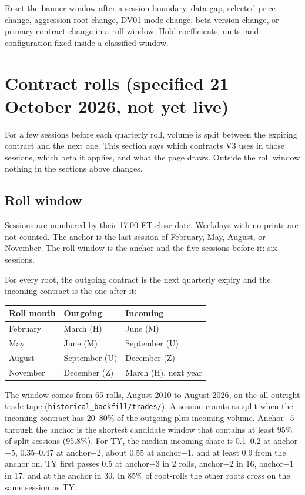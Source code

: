 \documentclass[11pt]{article}
\begin{document}
Reset the banner window after a session boundary, data gap, selected-price change, aggression-root change, DV01-mode change, beta-version change, or primary-contract change in a roll window. Hold coefficients, units, and configuration fixed inside a classified window.

\section{Contract rolls (specified 21 October 2026, not yet live)}

For a few sessions before each quarterly roll, volume is split between the expiring contract and the next one. This section says which contracts V3 uses in those sessions, which beta it applies, and what the page draws. Outside the roll window nothing in the sections above changes.

\subsection{Roll window}

Sessions are numbered by their 17:00 ET close date. Weekdays with no prints are not counted. The anchor is the last session of February, May, August, or November. The roll window is the anchor and the five sessions before it: six sessions.

For every root, the outgoing contract is the next quarterly expiry and the incoming contract is the one after it:
\begin{center}
\begin{tabular}{@{}lll@{}}
\toprule
\textbf{Roll month} & \textbf{Outgoing} & \textbf{Incoming} \\
\midrule
February & March (H) & June (M) \\
May & June (M) & September (U) \\
August & September (U) & December (Z) \\
November & December (Z) & March (H), next year \\
\bottomrule
\end{tabular}
\end{center}

The window comes from 65 rolls, August 2010 to August 2026, on the all-outright trade tape (\texttt{historical\_backfill/trades/}). A session counts as split when the incoming contract has 20--80\% of the outgoing-plus-incoming volume. Anchor$-5$ through the anchor is the shortest candidate window that contains at least 95\% of split sessions (95.8\%). For TY, the median incoming share is 0.1--0.2 at anchor$-5$, 0.35--0.47 at anchor$-2$, about 0.55 at anchor$-1$, and at least 0.9 from the anchor on. TY first passes 0.5 at anchor$-3$ in 2 rolls, anchor$-2$ in 16, anchor$-1$ in 17, and at the anchor in 30. In 85\% of root-rolls the other roots cross on the same session as TY.
\end{document}
